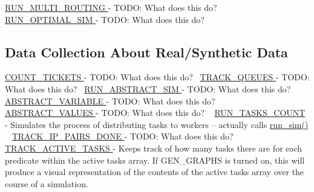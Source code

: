  \hyperlink{namespacedynamicfilterapp_1_1toggles_a5f084acb116f3a65b90532f6a2ecb81b}{R\+U\+N\+\_\+\+M\+U\+L\+T\+I\+\_\+\+R\+O\+U\+T\+I\+NG } -\/ T\+O\+DO\+: What does this do? ~\newline
 \hyperlink{namespacedynamicfilterapp_1_1toggles_a82ca5524da03a0787588ac48df06bb1a}{R\+U\+N\+\_\+\+O\+P\+T\+I\+M\+A\+L\+\_\+\+S\+IM } -\/ T\+O\+DO\+: What does this do? ~\newline
 \hypertarget{toggles_data2}{}\subsection{Data Collection About Real/\+Synthetic Data}\label{toggles_data2}
\hyperlink{namespacedynamicfilterapp_1_1toggles_ac35fabae4c109189ac40e759f367ee79}{C\+O\+U\+N\+T\+\_\+\+T\+I\+C\+K\+E\+TS } -\/ T\+O\+DO\+: What does this do?~\newline
 \hyperlink{namespacedynamicfilterapp_1_1toggles_a170d7dba5203e9b2ab89eb541ed83b3a}{T\+R\+A\+C\+K\+\_\+\+Q\+U\+E\+U\+ES } -\/ T\+O\+DO\+: What does this do?~\newline
\hyperlink{namespacedynamicfilterapp_1_1toggles_a73b7b22a82dc40407d03e22dca8ac257}{R\+U\+N\+\_\+\+A\+B\+S\+T\+R\+A\+C\+T\+\_\+\+S\+IM } -\/ T\+O\+DO\+: What does this do? ~\newline
 \hyperlink{namespacedynamicfilterapp_1_1toggles_a05ba5c39ee5a05284597d091b01650a3}{A\+B\+S\+T\+R\+A\+C\+T\+\_\+\+V\+A\+R\+I\+A\+B\+LE } -\/ T\+O\+DO\+: What does this do? ~\newline
 \hyperlink{namespacedynamicfilterapp_1_1toggles_ab64c8432c11e4b89425ac1f220ca01a9}{A\+B\+S\+T\+R\+A\+C\+T\+\_\+\+V\+A\+L\+U\+ES } -\/ T\+O\+DO\+: What does this do? ~\newline
 \hyperlink{namespacedynamicfilterapp_1_1toggles_a904bebe166c12146cac5f4dec979450c}{R\+U\+N\+\_\+\+T\+A\+S\+K\+S\+\_\+\+C\+O\+U\+NT } -\/ Simulates the process of distributing tasks to workers -- actually calls \hyperlink{}{run\+\_\+sim() } ~\newline
 \hyperlink{namespacedynamicfilterapp_1_1toggles_ac1bb03e2d3e1f9304e6628d802795547}{T\+R\+A\+C\+K\+\_\+\+I\+P\+\_\+\+P\+A\+I\+R\+S\+\_\+\+D\+O\+NE } -\/ T\+O\+DO\+: What does this do? ~\newline
 \hyperlink{namespacedynamicfilterapp_1_1toggles_a9c5fce243b39b491bbdf705555a92617}{T\+R\+A\+C\+K\+\_\+\+A\+C\+T\+I\+V\+E\+\_\+\+T\+A\+S\+KS } -\/ Keeps track of how many tasks there are for each predicate within the active tasks array. If G\+E\+N\+\_\+\+G\+R\+A\+P\+HS is turned on, this will produce a visual representation of the contents of the active tasks array over the course of a simulation. ~\newline
